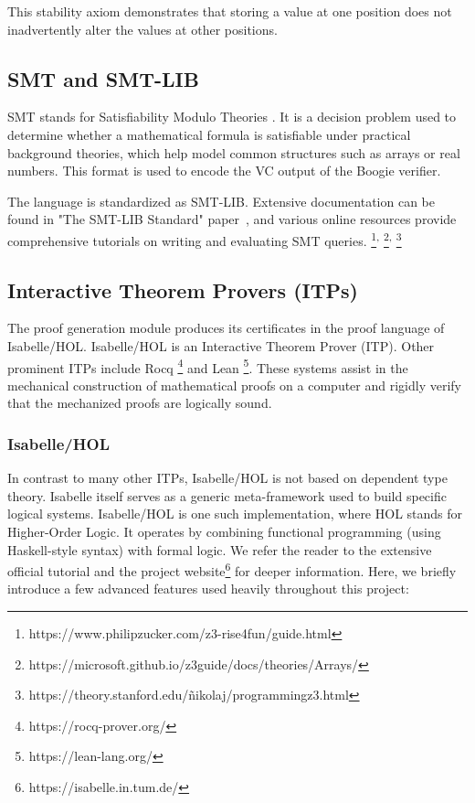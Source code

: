 \documentclass[11pt]{article}
\begin{document}
This stability axiom demonstrates that storing a value at one position
does not inadvertently alter the values at other positions.


\subsection{SMT and SMT-LIB}
SMT stands for Satisfiability Modulo Theories \cite{barrett2010smt}.
It is a decision problem used to determine whether a mathematical formula is satisfiable under practical background theories,
which help model common structures such as arrays or real numbers.
This format is used to encode the VC output of the Boogie verifier.

The language is standardized as SMT-LIB.
Extensive documentation can be found in "The SMT-LIB Standard" paper~\cite{barrett2010smt},
and various online resources provide comprehensive tutorials on writing and evaluating SMT queries.
\footnote{https://www.philipzucker.com/z3-rise4fun/guide.html}\textsuperscript{,}
\footnote{https://microsoft.github.io/z3guide/docs/theories/Arrays/}\textsuperscript{,}
\footnote{https://theory.stanford.edu/\~nikolaj/programmingz3.html}


\subsection{Interactive Theorem Provers (ITPs)}

The proof generation module produces its certificates in the proof language of Isabelle/HOL.
Isabelle/HOL is an Interactive Theorem Prover (ITP).
Other prominent ITPs include Rocq \cite{huet1997coq}\footnote{https://rocq-prover.org/}
and Lean \cite{de2015lean}\footnote{https://lean-lang.org/}.
These systems assist in the mechanical construction of mathematical proofs on a computer
and rigidly verify that the mechanized proofs are logically sound.

\subsubsection{Isabelle/HOL}
\label{sec:isabelle} 
In contrast to many other ITPs, Isabelle/HOL is not based on dependent type theory.
Isabelle itself serves as a generic meta-framework used to build specific logical systems.
Isabelle/HOL is one such implementation, where HOL stands for Higher-Order Logic.
It operates by combining functional programming (using Haskell-style syntax) with formal logic.
We refer the reader to the extensive official tutorial \cite{nipkow2002isabelle}
and the project website\footnote{https://isabelle.in.tum.de/} for deeper information.
Here, we briefly introduce a few advanced features used heavily throughout this project:
\end{document}
